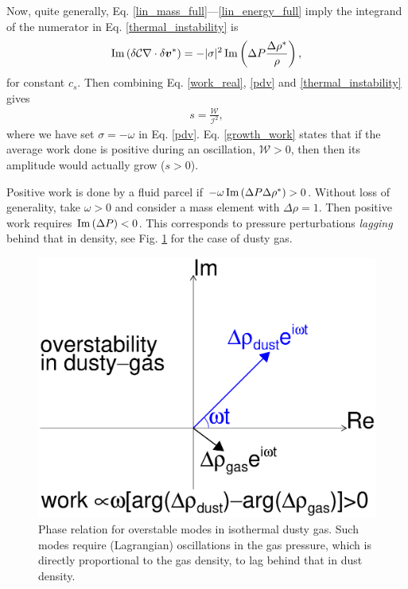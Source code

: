 Now, quite generally, Eq. \ref{lin_mass_full}---\ref{lin_energy_full} 
imply the integrand of the numerator in Eq. \ref{thermal_instability} 
is 
\begin{align} 
  \operatorname{Im} \left(\delta \mathcal{C}
  \nabla\cdot\delta \bm{v}^*\right) = 
  -|\sigma|^2\operatorname{Im} \left(\Delta P 
  \frac{\Delta\rho^*}{\rho}\right), \label{pdv}
\end{align}
for constant $c_s$. 
Then combining Eq. \ref{work_real}, \ref{pdv} and
\ref{thermal_instability} 
gives  
\begin{align}
s = \frac{\mathcal{W}}{\mathcal{I}^2}, \label{growth_work}
\end{align}
where we have set $\sigma= - \omega$ in 
Eq. \ref{pdv}. Eq. \ref{growth_work} states that if the average work
done is positive during an oscillation, $\mathcal{W}>0$, then 
then its amplitude would actually grow ($s>0$).  %

Positive work is done by a fluid parcel if $-\omega \operatorname{Im}\left(\Delta  
P\Delta\rho^*\right)>0$. Without loss of generality, take $\omega>0$
and consider a mass element with $\Delta\rho = 1$. Then positive work 
requires $\operatorname{Im}\left(\Delta
P\right)<0$.  This corresponds to pressure perturbations \emph{lagging}
behind that in density, see Fig. \ref{lag_cartoon}
for the case of dusty gas.   



\begin{figure}
  \includegraphics[width=\linewidth,clip=true,trim=0cm 5cm 0cm 0cm]{figures/lag}
  \caption{Phase relation for overstable modes in isothermal dusty
    gas. Such modes require (Lagrangian) oscillations in the gas
    pressure, which is directly proportional to the gas density, to
    lag behind that in dust density. 
    \label{lag_cartoon}
  }
\end{figure}


